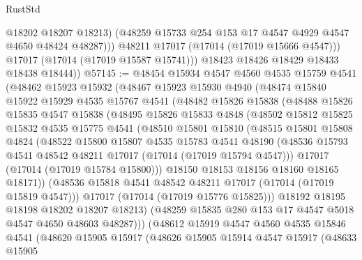 \begin{lexlean}{RustStd}
\begin{coremodule}
{\begin{coremodule}
{{{{{{{{{{{{{{{{{{{{{{{{{{{{{{{{{{{{{{{{{{{{{{{{{{{{{{{                  @18202
                  @18207
                  @18213)
                (@48259 @15733 @254 @153 @17 @4547 @4929 @4547 @4650 @48424 @48287)))
            @48211
            @17017
            (@17014 (@17019 @15666 @4547)))
          @17017
          (@17014 (@17019 @15587 @15741)))
        @18423
        @18426
        @18429
        @18433
        @18438
        @18444))
@57145 := @48454
    @15934
    @4547
    @4560
    @4535
    @15759
    @4541
    (@48462
      @15923
      @15932
      (@48467
        @15923
        @15930
        @4940
        (@48474
          @15840
          @15922
          @15929
          @4535
          @15767
          @4541
          (@48482
            @15826
            @15838
            (@48488
              @15826
              @15835
              @4547
              @15838
              (@48495
                @15826
                @15833
                @4848
                (@48502
                  @15812
                  @15825
                  @15832
                  @4535
                  @15775
                  @4541
                  (@48510
                    @15801
                    @15810
                    (@48515
                      @15801
                      @15808
                      @4824
                      (@48522
                        @15800
                        @15807
                        @4535
                        @15783
                        @4541
                        @48190
                        (@48536 @15793 @4541 @48542 @48211 @17017 (@17014 (@17019 @15794 @4547)))
                        @17017
                        (@17014 (@17019 @15784 @15800)))
                      @18150
                      @18153
                      @18156
                      @18160
                      @18165
                      @18171))
                  (@48536 @15818 @4541 @48542 @48211 @17017 (@17014 (@17019 @15819 @4547)))
                  @17017
                  (@17014 (@17019 @15776 @15825)))
                @18192
                @18195
                @18198
                @18202
                @18207
                @18213)
              (@48259 @15835 @280 @153 @17 @4547 @5018 @4547 @4650 @48603 @48287)))
          (@48612
            @15919
            @4547
            @4560
            @4535
            @15846
            @4541
            (@48620
              @15905
              @15917
              (@48626
                @15905
                @15914
                @4547
                @15917
                (@48633
                  @15905
}}}}}}}}}}}}}}}}}}}}}}}}}}}}}}}}}}}}}}}}}}}}}}}}}}}}}}}
\end{coremodule}}
\end{coremodule}
\end{lexlean}
